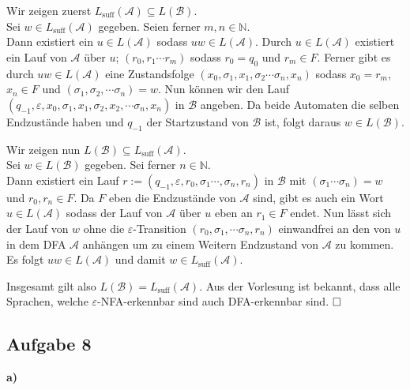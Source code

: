 \documentclass[a4paper,graphics,11pt]{article}
\newcommand{\aufgabe}[1]{\subsection*{Aufgabe #1}}
\begin{document}
Wir zeigen zuerst $L_{\text{suff}}(\mathcal{A}) \subseteq L(\mathcal{B})$.\\[2pt]
Sei $w \in L_{\text{suff}}(\mathcal{A})$ gegeben. Seien ferner $m,n \in \mathbb{N}$.\\
Dann existiert ein $u \in L(\mathcal{A})$ sodass $uw \in L(\mathcal{A})$.
Durch $u \in L(\mathcal{A})$ existiert ein Lauf von $\mathcal{A}$ über $u$;
$(r_0, r_1 \cdots r_m)$ sodass $r_0 = q_0$ und $r_m \in F$.
Ferner gibt es durch $uw \in L(\mathcal{A})$ eine Zustandsfolge
$(x_0, \sigma_1, x_1, \sigma_2 \cdots \sigma_n, x_n)$ sodass $x_0 = r_m$, $x_n \in F$ und
$(\sigma_1, \sigma_2, \cdots \sigma_n) = w$. Nun können wir den Lauf $(q_{-1}, \varepsilon, x_0, \sigma_1, x_1, \sigma_2, x_2, \cdots \sigma_n, x_n)$ in $\mathcal{B}$ angeben. Da beide
Automaten die selben Endzustände haben und $q_{-1}$ der Startzustand von $\mathcal{B}$ ist, folgt daraus $w \in L(\mathcal{B})$.
\newpage

Wir zeigen nun $L(\mathcal{B}) \subseteq L_{\text{suff}}(\mathcal{A})$.\\[2pt]
Sei $w \in L(\mathcal{B})$ gegeben. Sei ferner $n \in \mathbb{N}$.\\
Dann existiert ein Lauf $r := (q_{-1}, \varepsilon, r_0, \sigma_1 \cdots, \sigma_n, r_n)$
in $\mathcal{B}$ mit $(\sigma_1 \cdots \sigma_n) = w$ und $r_0, r_n \in F$.
Da $F$ eben die Endzustände von $\mathcal{A}$ sind, gibt es auch ein Wort $u \in L(\mathcal{A})$ sodass der Lauf von $\mathcal{A}$ über $u$ eben an $r_1 \in F$ endet. Nun lässt sich der Lauf
von $w$ ohne die $\varepsilon$-Transition $(r_0, \sigma_1, \cdots \sigma_n, r_n)$ einwandfrei
an den von $u$ in dem DFA $\mathcal{A}$ anhängen um zu einem Weitern Endzustand von $\mathcal{A}$ zu kommen. Es folgt $uw \in L(\mathcal{A})$ und damit $w \in L_{\text{suff}}(\mathcal{A})$.

Insgesamt gilt also $L(\mathcal{B}) = L_{\text{suff}}(\mathcal{A})$. Aus der Vorlesung ist
bekannt, dass alle Sprachen, welche $\varepsilon$-NFA-erkennbar sind auch DFA-erkennbar sind.
$\hfill\square$

\aufgabe{8}
\textbf{a)}\\

\end{document}
